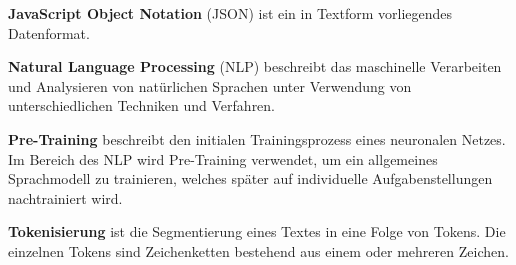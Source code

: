 \textbf{JavaScript Object Notation} (JSON) ist ein in Textform vorliegendes Datenformat.

\textbf{Natural Language Processing} (NLP) beschreibt das maschinelle Verarbeiten und Analysieren von natürlichen Sprachen unter Verwendung von unterschiedlichen Techniken und Verfahren. 

\textbf{Pre-Training} beschreibt den initialen Trainingsprozess eines neuronalen Netzes. Im Bereich des NLP wird Pre-Training verwendet, um ein allgemeines Sprachmodell zu trainieren, welches später auf individuelle Aufgabenstellungen nachtrainiert wird.

\textbf{Tokenisierung} ist die Segmentierung eines Textes in eine Folge von Tokens. Die einzelnen Tokens sind Zeichenketten bestehend aus einem oder mehreren Zeichen.

\pagebreak
